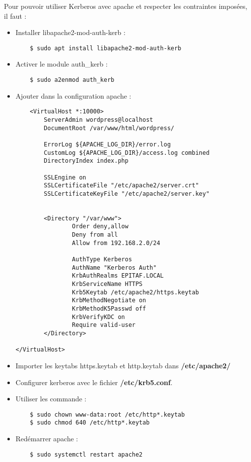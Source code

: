 Pour pouvoir utiliser Kerberos avec apache et respecter les contraintes imposées, il faut : 
\begin{itemize}
    \item Installer libapache2-mod-auth-kerb :
    \begin{verbatim}
    $ sudo apt install libapache2-mod-auth-kerb
    \end{verbatim}
    
    \item Activer le module auth\_kerb :
    \begin{verbatim}
    $ sudo a2enmod auth_kerb
    \end{verbatim}
    
    \item Ajouter dans la configuration apache :
    \begin{verbatim}
    <VirtualHost *:10000>
        ServerAdmin wordpress@localhost
        DocumentRoot /var/www/html/wordpress/

        ErrorLog ${APACHE_LOG_DIR}/error.log
        CustomLog ${APACHE_LOG_DIR}/access.log combined
        DirectoryIndex index.php

        SSLEngine on
        SSLCertificateFile "/etc/apache2/server.crt"
        SSLCertificateKeyFile "/etc/apache2/server.key"


        <Directory "/var/www">
                Order deny,allow
                Deny from all
                Allow from 192.168.2.0/24

                AuthType Kerberos
                AuthName "Kerberos Auth"
                KrbAuthRealms EPITAF.LOCAL
                KrbServiceName HTTPS
                Krb5Keytab /etc/apache2/https.keytab
                KrbMethodNegotiate on
                KrbMethodK5Passwd off
                KrbVerifyKDC on
                Require valid-user
        </Directory>

</VirtualHost>
    \end{verbatim}
    \item Importer les keytabs https.keytab et http.keytab dans \textbf{/etc/apache2/}
    \item Configurer kerberos avec le fichier \textbf{/etc/krb5.conf}. 
    \item Utiliser les commande : 
        \begin{verbatim}
    $ sudo chown www-data:root /etc/http*.keytab
    $ sudo chmod 640 /etc/http*.keytab
    \end{verbatim}
    \item Redémarrer apache :
    \begin{verbatim}
    $ sudo systemctl restart apache2
    \end{verbatim}
\end{itemize}
